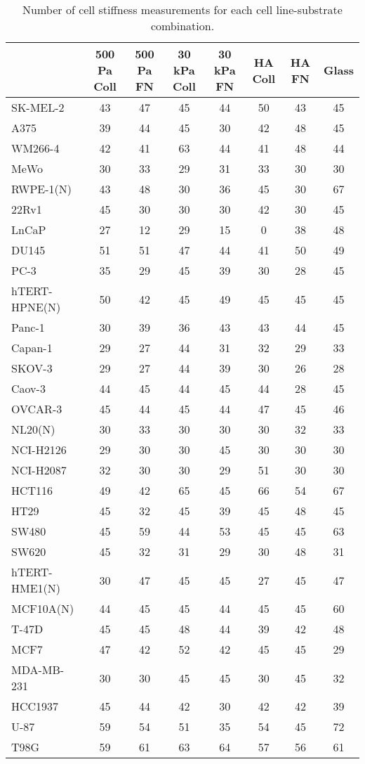 \begin{table}[!h]
\centering
\caption{\label{tab:count-cell_stiffness}Number of cell stiffness measurements for each cell line-substrate combination.}
\centering
\begin{tabular}[t]{lccccccc}
\toprule
  & 500 Pa Coll & 500 Pa FN & 30 kPa Coll & 30 kPa FN & HA Coll & HA FN & Glass\\
\midrule
SK-MEL-2 & 43 & 47 & 45 & 44 & 50 & 43 & 45\\
A375 & 39 & 44 & 45 & 30 & 42 & 48 & 45\\
WM266-4 & 42 & 41 & 63 & 44 & 41 & 48 & 44\\
MeWo & 30 & 33 & 29 & 31 & 33 & 30 & 30\\
RWPE-1(N) & 43 & 48 & 30 & 36 & 45 & 30 & 67\\
22Rv1 & 45 & 30 & 30 & 30 & 42 & 30 & 45\\
LnCaP & 27 & 12 & 29 & 15 & 0 & 38 & 48\\
DU145 & 51 & 51 & 47 & 44 & 41 & 50 & 49\\
PC-3 & 35 & 29 & 45 & 39 & 30 & 28 & 45\\
hTERT-HPNE(N) & 50 & 42 & 45 & 49 & 45 & 45 & 45\\
Panc-1 & 30 & 39 & 36 & 43 & 43 & 44 & 45\\
Capan-1 & 29 & 27 & 44 & 31 & 32 & 29 & 33\\
SKOV-3 & 29 & 27 & 44 & 39 & 30 & 26 & 28\\
Caov-3 & 44 & 45 & 44 & 45 & 44 & 28 & 45\\
OVCAR-3 & 45 & 44 & 45 & 44 & 47 & 45 & 46\\
NL20(N) & 30 & 33 & 30 & 30 & 30 & 32 & 33\\
NCI-H2126 & 29 & 30 & 30 & 45 & 30 & 30 & 30\\
NCI-H2087 & 32 & 30 & 30 & 29 & 51 & 30 & 30\\
HCT116 & 49 & 42 & 65 & 45 & 66 & 54 & 67\\
HT29 & 45 & 32 & 45 & 39 & 45 & 48 & 45\\
SW480 & 45 & 59 & 44 & 53 & 45 & 45 & 63\\
SW620 & 45 & 32 & 31 & 29 & 30 & 48 & 31\\
hTERT-HME1(N) & 30 & 47 & 45 & 45 & 27 & 45 & 47\\
MCF10A(N) & 44 & 45 & 45 & 44 & 45 & 45 & 60\\
T-47D & 45 & 45 & 48 & 44 & 39 & 42 & 48\\
MCF7 & 47 & 42 & 52 & 42 & 45 & 45 & 29\\
MDA-MB-231 & 30 & 30 & 45 & 45 & 30 & 45 & 32\\
HCC1937 & 45 & 44 & 42 & 30 & 42 & 42 & 39\\
U-87 & 59 & 54 & 51 & 35 & 54 & 45 & 72\\
T98G & 59 & 61 & 63 & 64 & 57 & 56 & 61\\
\bottomrule
\end{tabular}
\end{table}
